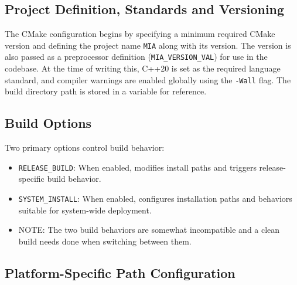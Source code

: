 \subsection{Project Definition, Standards and Versioning}

The CMake configuration begins by specifying a minimum required CMake version and defining the project name \texttt{MIA} along with its version. The version is also passed as a preprocessor definition (\texttt{MIA\_VERSION\_VAL}) for use in the codebase. At the time of writing this, C++20 is set as the required language standard, and compiler warnings are enabled globally using the \texttt{-Wall} flag. The build directory path is stored in a variable for reference.

\subsection{Build Options}

Two primary options control build behavior:
\begin{itemize}\itemsep0em
	\item \texttt{RELEASE\_BUILD}: When enabled, modifies install paths and triggers release-specific build behavior.
	\item \texttt{SYSTEM\_INSTALL}: When enabled, configures installation paths and behaviors suitable for system-wide deployment.
	\item NOTE: The two build behaviors are somewhat incompatible and a clean build needs done when switching between them.
\end{itemize}

\subsection{Platform-Specific Path Configuration}

